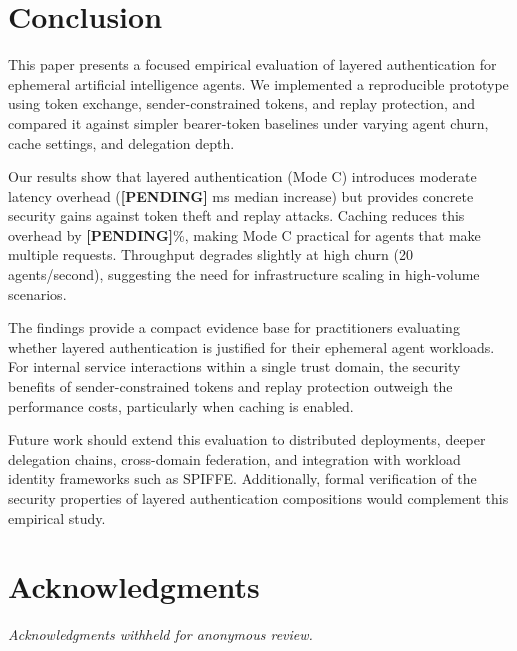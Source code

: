 \documentclass[conference,10pt]{IEEEtran}
\begin{document}
\section{Conclusion}

This paper presents a focused empirical evaluation of layered authentication for ephemeral artificial intelligence agents. We implemented a reproducible prototype using token exchange, sender-constrained tokens, and replay protection, and compared it against simpler bearer-token baselines under varying agent churn, cache settings, and delegation depth.

Our results show that layered authentication (Mode C) introduces moderate latency overhead (\textbf{[PENDING]} ms median increase) but provides concrete security gains against token theft and replay attacks. Caching reduces this overhead by \textbf{[PENDING]}\%, making Mode C practical for agents that make multiple requests. Throughput degrades slightly at high churn (20 agents/second), suggesting the need for infrastructure scaling in high-volume scenarios.

The findings provide a compact evidence base for practitioners evaluating whether layered authentication is justified for their ephemeral agent workloads. For internal service interactions within a single trust domain, the security benefits of sender-constrained tokens and replay protection outweigh the performance costs, particularly when caching is enabled.

Future work should extend this evaluation to distributed deployments, deeper delegation chains, cross-domain federation, and integration with workload identity frameworks such as SPIFFE. Additionally, formal verification of the security properties of layered authentication compositions would complement this empirical study.

\section*{Acknowledgments}
\textit{Acknowledgments withheld for anonymous review.}



\end{document}
